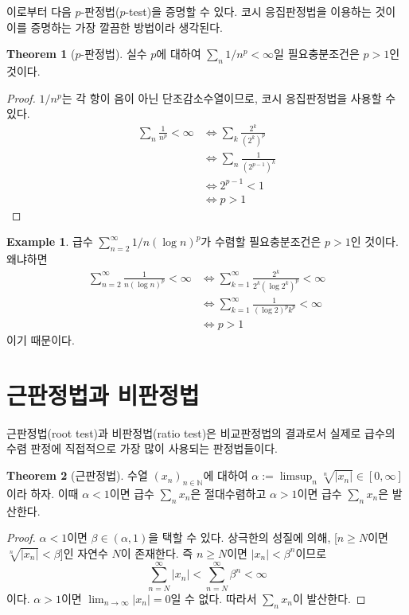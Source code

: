 \documentclass[11pt]{book}
\numberwithin{equation}{chapter}
\def\NN{\mathbb{N}}
\newcommand{\abs}[1]{\left\vert#1\right\vert}
\theoremstyle{definition}
\newtheorem{thm}{Theorem}[section]
\newtheorem*{ex}{Example}
\begin{document}
이로부터 다음 \(p\)-판정법(\(p\)-test)을 증명할 수 있다. 코시 응집판정법을 이용하는 것이 이를 증명하는 가장 깔끔한 방법이라 생각된다.

\begin{thm}[\(p\)-판정법]
    실수 \(p\)에 대하여 \(\sum_n 1/n^p < \infty\)일 필요충분조건은 \(p > 1\)인 것이다.
\end{thm}
\begin{proof}
    \(1/n^p\)는 각 항이 음이 아닌 단조감소수열이므로, 코시 응집판정법을 사용할 수 있다.
    \begin{align*}
        \sum_n \frac{1}{n^p} < \infty &\iff \sum_k \frac{2^k}{(2^k)^p}\\
        &\iff \sum_n \frac{1}{(2^{p-1})^k}\\
        &\iff 2^{p-1} < 1\\
        &\iff p > 1
    \end{align*}
\end{proof}

\begin{ex}
    급수 \(\sum_{n=2}^\infty 1/n(\log n)^p\)가 수렴할 필요충분조건은 \(p > 1\)인 것이다. 왜냐하면
    \begin{align*}
        \sum_{n=2}^\infty \frac{1}{n(\log n)^p} < \infty &\iff \sum_{k=1}^\infty \frac{2^k}{2^k (\log 2^k)^p} < \infty\\
        &\iff \sum_{k=1}^\infty \frac{1}{(\log 2)^p k^p} < \infty\\
        &\iff p > 1
    \end{align*}
    이기 때문이다.
\end{ex}

\section{근판정법과 비판정법}

근판정법(root test)과 비판정법(ratio test)은 비교판정법의 결과로서 실제로 급수의 수렴 판정에 직접적으로 가장 많이 사용되는 판정법들이다.

\begin{thm} [근판정법]
    수열 \((x_n)_{n \in \NN}\)에 대하여 \(\alpha := \limsup_n \sqrt[n]{\abs{x_n}} \in [0, \infty]\)이라 하자. 이때 \(\alpha < 1\)이면 급수 \(\sum_n x_n\)은 절대수렴하고 \(\alpha > 1\)이면 급수 \(\sum_n x_n\)은 발산한다.
\end{thm}
\begin{proof}
    \(\alpha < 1\)이면 \(\beta \in (\alpha, 1)\)을 택할 수 있다. 상극한의 성질에 의해, [\(n \ge N\)이면 \(\sqrt[n]{\abs{x_n}} < \beta\)]인 자연수 \(N\)이 존재한다. 즉 \(n \ge N\)이면 \(\abs{x_n} < \beta^n\)이므로
    \[
    \sum_{n=N}^\infty \abs{x_n} < \sum_{n = N}^{\infty} \beta^n < \infty    
    \]
    이다. \(\alpha > 1\)이면 \(\lim_{n \to \infty} \abs{x_n} = 0\)일 수 없다. 따라서 \(\sum_n x_n\)이 발산한다.
\end{proof}
\end{document}
